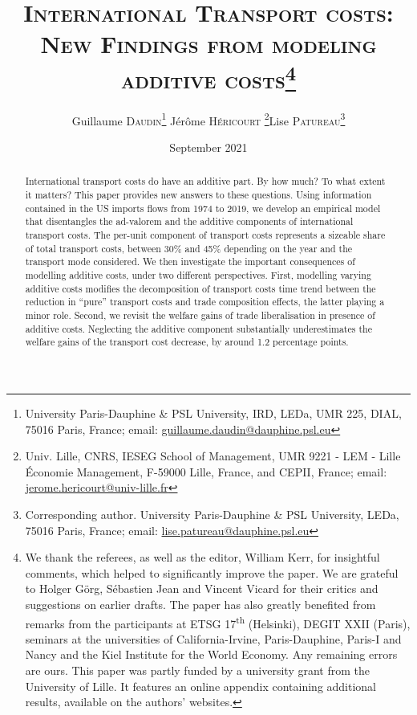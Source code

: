 \documentclass[a4paper,11pt]{article}
\begin{document}
\title{\textsc{International Transport costs:\\New Findings from modeling additive costs}\thanks{We thank the referees, as well as the editor, William Kerr, for insightful comments, which helped to significantly improve the paper. We are grateful to Holger G\"{o}rg, S\'{e}bastien Jean and Vincent Vicard for their critics and suggestions on earlier drafts. The paper has also greatly benefited from remarks from the participants at ETSG 17\textsuperscript{th} (Helsinki), DEGIT XXII (Paris), seminars at the universities of California-Irvine, Paris-Dauphine, Paris-I and Nancy and the Kiel Institute for the World Economy. Any remaining errors are ours. This paper was partly funded by a university grant from the University of Lille. It features an online appendix containing additional results, available on the authors' websites.}}

\author{Guillaume \textsc{Daudin}\thanks{%
University Paris-Dauphine \& PSL University, IRD, LEDa, UMR 225, DIAL, 75016 Paris, France; email: \url{guillaume.daudin@dauphine.psl.eu}}  \qquad J\'{e}r\^{o}me \textsc{H\'{e}ricourt} \thanks{Univ. Lille, CNRS, IESEG School of Management, UMR 9221 - LEM - Lille Économie Management, F-59000 Lille, France, and CEPII, France; email: \url{jerome.hericourt@univ-lille.fr}}\qquad Lise \textsc{Patureau}\thanks{Corresponding author.
University Paris-Dauphine \& PSL University, LEDa, 75016 Paris, France;  email: \url{lise.patureau@dauphine.psl.eu} } }


\date{September 2021}
 \maketitle
\bigskip

\begin{abstract}
International transport costs do have an additive part. By how much? To what extent it matters? This paper provides new answers to these questions. Using information contained in the US imports flows from 1974 to 2019, we develop an empirical model that disentangles the ad-valorem and the additive components of international transport costs. The per-unit component of transport costs represents a sizeable share of total transport costs, between 30\% and 45\% depending on the year and the transport mode considered. We then investigate the important consequences of modelling additive costs, under two different perspectives. First, modelling varying additive costs modifies the decomposition of transport costs time trend between the reduction in ``pure'' transport costs and trade composition effects, the latter playing a minor role. Second, we revisit the welfare gains of trade liberalisation in presence of additive costs. Neglecting the additive component substantially underestimates the welfare gains of the transport cost decrease, by around 1.2 percentage points. %
\end{abstract}
\end{document}
